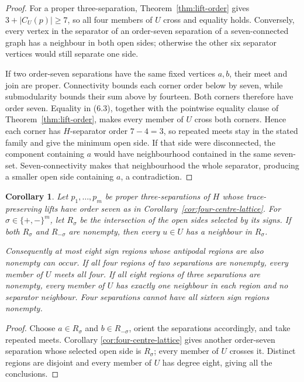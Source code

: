 \documentclass[11pt]{amsart}
\newtheorem{corollary}[theorem]{Corollary}
\begin{document}
\begin{proof}
For a proper three-separation, Theorem~\ref{thm:lift-order} gives
$3+|C_U(p)|\geq7$, so all four members of $U$ cross and equality holds.
Conversely, every vertex in the separator of an order-seven separation of a
seven-connected graph has a neighbour in both open sides; otherwise the
other six separator vertices would still separate one side.

If two order-seven separations have the same fixed vertices $a,b$, their
meet and join are proper.  Connectivity bounds each corner order below by
seven, while submodularity bounds their sum above by fourteen.  Both corners
therefore have order seven.  Equality in (6.3), together with the pointwise
equality clause of Theorem~\ref{thm:lift-order}, makes every member of $U$
cross both corners.  Hence each corner has $H$-separator order $7-4=3$, so
repeated meets stay in the stated family and give the minimum open side.  If
that side were disconnected, the component containing $a$ would have
neighbourhood contained in the same seven-set.  Seven-connectivity makes
that neighbourhood the whole separator, producing a smaller open side
containing $a$, a contradiction.
\end{proof}

\begin{corollary}\label{cor:crossing-regions}
Let $p_1,\ldots,p_m$ be proper three-separations of $H$ whose
trace-preserving lifts have order seven as in
Corollary~\ref{cor:four-centre-lattice}.  For
$\sigma\in\{+,-\}^m$, let $R_\sigma$ be the intersection of the open
sides selected by its signs.  If both $R_\sigma$ and $R_{-\sigma}$ are
nonempty, then every $u\in U$ has a neighbour in $R_\sigma$.

Consequently at most eight sign regions whose antipodal regions are also
nonempty can occur.  If all four regions of two separations are nonempty,
every member of $U$ meets all four.  If all eight regions of three
separations are nonempty, every member of $U$ has exactly one neighbour in
each region and no separator neighbour.  Four separations cannot have all
sixteen sign regions nonempty.
\end{corollary}

\begin{proof}
Choose $a\in R_\sigma$ and $b\in R_{-\sigma}$, orient the separations
accordingly, and take repeated meets.  Corollary
\ref{cor:four-centre-lattice} gives another order-seven separation whose
selected open side is $R_\sigma$; every member of $U$ crosses it.  Distinct
regions are disjoint and every member of $U$ has degree eight, giving all
the conclusions.
\end{proof}
\end{document}
